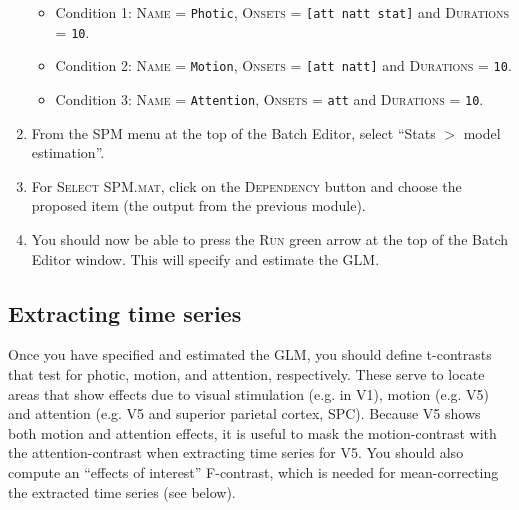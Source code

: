 \begin{enumerate}
\begin{itemize}
  \item Condition 1: \textsc{Name} = \texttt{Photic}, \textsc{Onsets} = \texttt{[att natt stat]} and \textsc{Durations} = \texttt{10}.
  \item Condition 2: \textsc{Name} = \texttt{Motion}, \textsc{Onsets} = \texttt{[att natt]} and \textsc{Durations} = \texttt{10}.
  \item Condition 3: \textsc{Name} = \texttt{Attention}, \textsc{Onsets} = \texttt{att} and \textsc{Durations} = \texttt{10}.
 \end{itemize}
 \item From the SPM menu at the top of the Batch Editor, select ``Stats $>$ model estimation''.
 \item For \textsc{Select SPM.mat}, click on the \textsc{Dependency} button and choose the proposed item (the output from the previous module).
 \item You should now be able to press the \textsc{Run} green arrow at the top of the Batch Editor window. This will specify and estimate the GLM.
\end{enumerate}

\subsection{Extracting time series}

Once you have specified and estimated the GLM, you should define t-contrasts that test for photic, motion, and attention, respectively. These serve to locate areas that show effects due to visual stimulation (e.g. in V1), motion (e.g. V5) and attention (e.g. V5 and superior parietal cortex, SPC). Because V5 shows both motion and attention effects, it is useful to mask the motion-contrast with the attention-contrast when extracting time series for V5. You should also compute an ``effects of interest'' F-contrast, which is needed for mean-correcting the extracted time series (see below).

